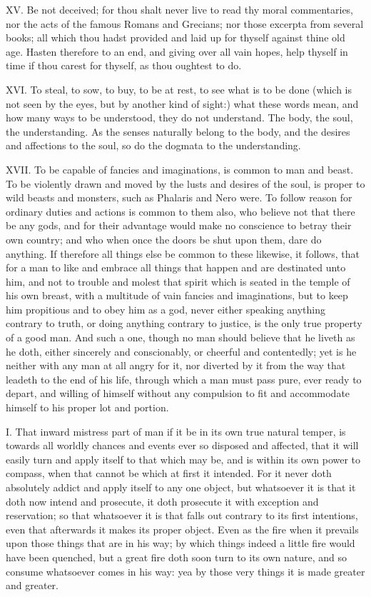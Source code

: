 XV. Be not deceived; for thou shalt never live to read thy moral
commentaries, nor the acts of the famous Romans and Grecians; nor those
excerpta from several books; all which thou hadst provided and laid up for
thyself against thine old age. Hasten therefore to an end, and giving over
all vain hopes, help thyself in time if thou carest for thyself, as thou
oughtest to do.

XVI. To steal, to sow, to buy, to be at rest, to see what is to be done
(which is not seen by the eyes, but by another kind of sight:) what these
words mean, and how many ways to be understood, they do not understand.
The body, the soul, the understanding. As the senses naturally belong to
the body, and the desires and affections to the soul, so do the dogmata to
the understanding.

XVII. To be capable of fancies and imaginations, is common to man and
beast. To be violently drawn and moved by the lusts and desires of the
soul, is proper to wild beasts and monsters, such as Phalaris and Nero
were. To follow reason for ordinary duties and actions is common to them
also, who believe not that there be any gods, and for their advantage
would make no conscience to betray their own country; and who when once
the doors be shut upon them, dare do anything. If therefore all things
else be common to these likewise, it follows, that for a man to like and
embrace all things that happen and are destinated unto him, and not to
trouble and molest that spirit which is seated in the temple of his own
breast, with a multitude of vain fancies and imaginations, but to keep him
propitious and to obey him as a god, never either speaking anything
contrary to truth, or doing anything contrary to justice, is the only true
property of a good man. And such a one, though no man should believe that
he liveth as he doth, either sincerely and conscionably, or cheerful and
contentedly; yet is he neither with any man at all angry for it, nor
diverted by it from the way that leadeth to the end of his life, through
which a man must pass pure, ever ready to depart, and willing of himself
without any compulsion to fit and accommodate himself to his proper lot
and portion.


I. That inward mistress part of man if it be in its own true natural
temper, is towards all worldly chances and events ever so disposed and
affected, that it will easily turn and apply itself to that which may be,
and is within its own power to compass, when that cannot be which at first
it intended. For it never doth absolutely addict and apply itself to any
one object, but whatsoever it is that it doth now intend and prosecute, it
doth prosecute it with exception and reservation; so that whatsoever it is
that falls out contrary to its first intentions, even that afterwards it
makes its proper object. Even as the fire when it prevails upon those
things that are in his way; by which things indeed a little fire would
have been quenched, but a great fire doth soon turn to its own nature, and
so consume whatsoever comes in his way: yea by those very things it is
made greater and greater.

